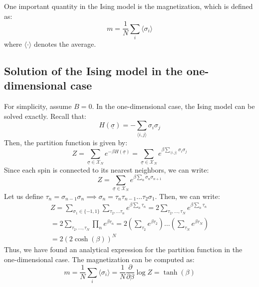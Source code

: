 One important quantity in the Ising model is the magnetization, which is defined as:
\begin{equation}
    m = \frac{1}{N}\sum_i \langle \sigma_i \rangle
\end{equation}
where $\langle \cdot \rangle$ denotes the average.

\subsection{Solution of the Ising model in the one-dimensional case}
For simplicity, assume $B=0$. In the one-dimensional case, the Ising model can be solved exactly. Recall that:
\begin{equation}
    H(\underline{\sigma}) = -\sum_{\langle i,j\rangle}\sigma_i\sigma_j
\end{equation}
Then, the partition function is given by:
\begin{equation}
    Z = \sum_{\underline{\sigma}\in\mathcal{X}_N}e^{-\beta H(\underline{\sigma})} =
    \sum_{\underline{\sigma}\in\mathcal{X}_N}e^{\beta\sum_{\langle i,j\rangle}\sigma_i\sigma_j}
\end{equation}
Since each spin is connected to its nearest neighbors, we can write:
\begin{equation}
    Z =  \sum_{\underline{\sigma}\in\mathcal{X}_N}e^{\beta\sum_n\sigma_n\sigma_{n+1}}
\end{equation}
Let us define $\tau_n = \sigma_{n-1}\sigma_{n} \implies \sigma_n = \tau_n\tau_{n-1}\dots\tau_2\sigma_1$. Then, we can write:
\begin{equation}
    \begin{gathered}
    Z =  \sum_{\sigma_1\in\{-1,1\}}\sum_{\tau_2,\dots\tau_n}e^{\beta\sum_n\tau_n}
    = 2\sum_{\tau_2,\dots,\tau_N}e^{\beta\sum_n\tau_n}\\
    = 2\sum_{\tau_2,\dots,\tau_N}\prod_n e^{\beta\tau_n}
    = 2(\sum_{\tau_2}e^{\beta\tau_2})\dots(\sum_{\tau_N}e^{\beta\tau_N})\\
    = 2(2\cosh(\beta))^{N}
    \end{gathered}
\end{equation}
Thus, we have found an analytical expression for the partition function in the one-dimensional case. The magnetization can be computed as:
\begin{equation}
    m = \frac{1}{N}\sum_i \langle \sigma_i \rangle = \frac{1}{N}\frac{\partial}{\partial \beta}\log Z = \tanh(\beta)
\end{equation}

